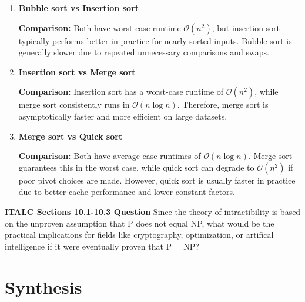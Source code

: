 \documentclass{article}
\theoremstyle{theorem}
\theoremstyle{definition}
\theoremstyle{remark}
\begin{document}
\begin{enumerate}
    \item \textbf{Bubble sort vs Insertion sort}

    \textbf{Comparison:} Both have worst-case runtime \( \mathcal{O}(n^2) \), but insertion sort typically performs better in practice for nearly sorted inputs. Bubble sort is generally slower due to repeated unnecessary comparisons and swaps.

    \item \textbf{Insertion sort vs Merge sort}

    \textbf{Comparison:} Insertion sort has a worst-case runtime of \( \mathcal{O}(n^2) \), while merge sort consistently runs in \( \mathcal{O}(n \log n) \). Therefore, merge sort is asymptotically faster and more efficient on large datasets.

    \item \textbf{Merge sort vs Quick sort}

    \textbf{Comparison:} Both have average-case runtimes of \( \mathcal{O}(n \log n) \). Merge sort guarantees this in the worst case, while quick sort can degrade to \( \mathcal{O}(n^2) \) if poor pivot choices are made. However, quick sort is usually faster in practice due to better cache performance and lower constant factors.
\end{enumerate}

\textbf{ITALC Sections 10.1-10.3 Question}
Since the theory of intractibility is based on the unproven assumption that P does not equal NP, what would be the practical implications for fields like cryptography, optimization, or artifical intelligence if it were eventually proven that P = NP?

\section{Synthesis}
\end{document}
